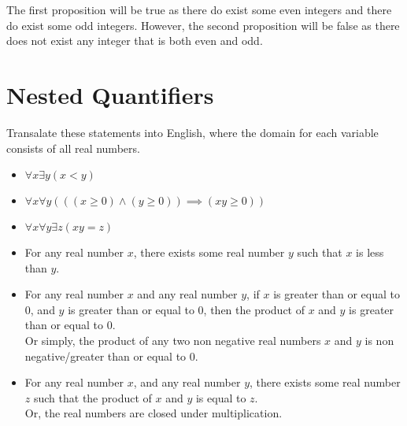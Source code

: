 \documentclass[addpoints]{exam}
\newenvironment{problem}[2][Problem]{\begin{trivlist}
    \item[\hskip \labelsep {\bfseries #1}\hskip \labelsep {\bfseries #2.}]}{\end{trivlist}}
\begin{document}
\begin{sloppypar}
\begin{questions}
\begin{solution}
        The first proposition will be true as there do exist some even integers and there do exist some odd integers. However, the second proposition will be false as there does not exist any integer that is both even and odd.
    \end{solution}
\end{questions}
\pagebreak
\section*{Nested Quantifiers}
\begin{problem}{14}
Transalate these statements into English, where the domain for each variable consists of all real numbers.
\begin{itemize}
    \item[(a)] $\forall x \exists y (x < y) $
    \item[(b)] $\forall x \forall y (((x \geq 0) \land (y \geq 0) ) \implies (xy \geq 0)) $
    \item[(c)] $\forall x \forall y \exists z (xy=z) $
\end{itemize}
\end{problem}

\begin{questions}
    \question
    \begin{solution}
        \begin{itemize}
            \item[(a)] For any real number $x$, there exists some real number $y$ such that $x$ is less than $y$.
            \item[(b)] For any real number $x$ and any real number $y$, if $x$ is greater than or equal to 0, and $y$ is greater than or equal to 0, then the product of $x$ and $y$ is greater than or equal to 0. \\ Or simply, the product of any two non negative real numbers $x$ and $y$ is non negative/greater than or equal to 0.
            \item[(c)] For any real number $x$, and any real number $y$, there exists some real number $z$ such that the product of $x$ and $y$ is equal to $z$. \\ Or, the real numbers are closed under multiplication.  
        \end{itemize}
    \end{solution}
\end{questions}


\end{sloppypar}
\end{document}
